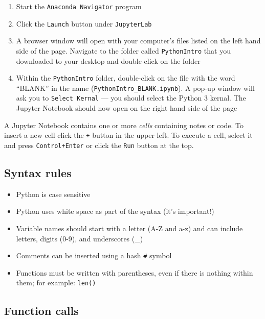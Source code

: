 \documentclass[
]{book}
\providecommand{\tightlist}{%
  \setlength{\itemsep}{0pt}\setlength{\parskip}{0pt}}
\begin{document}
\begin{enumerate}
\def\labelenumi{\arabic{enumi}.}
\tightlist
\item
  Start the \texttt{Anaconda\ Navigator} program
\item
  Click the \texttt{Launch} button under \texttt{JupyterLab}
\item
  A browser window will open with your computer's files listed on the left hand side of the page. Navigate to the folder called \texttt{PythonIntro} that you downloaded to your desktop and double-click on the folder
\item
  Within the \texttt{PythonIntro} folder, double-click on the file with the word ``BLANK'' in the name (\texttt{PythonIntro\_BLANK.ipynb}). A pop-up window will ask you to \texttt{Select\ Kernal} --- you should select the Python 3 kernal. The Jupyter Notebook should now open on the right hand side of the page
\end{enumerate}

A Jupyter Notebook contains one or more \emph{cells} containing notes or code. To insert a new cell click the \texttt{+} button in the upper left. To execute a cell, select it and press \texttt{Control+Enter} or click the \texttt{Run} button at the top.

\hypertarget{syntax-rules-1}{%
\subsection{Syntax rules}\label{syntax-rules-1}}

\begin{itemize}
\tightlist
\item
  Python is case sensitive
\item
  Python uses white space as part of the syntax (it's important!)
\item
  Variable names should start with a letter (A-Z and a-z)
  and can include letters, digits (0-9), and underscores (\_)
\item
  Comments can be inserted using a hash \texttt{\#} symbol
\item
  Functions must be written with parentheses, even
  if there is nothing within them; for example: \texttt{len()}
\end{itemize}

\hypertarget{function-calls-1}{%
\subsection{Function calls}\label{function-calls-1}}
\end{document}
